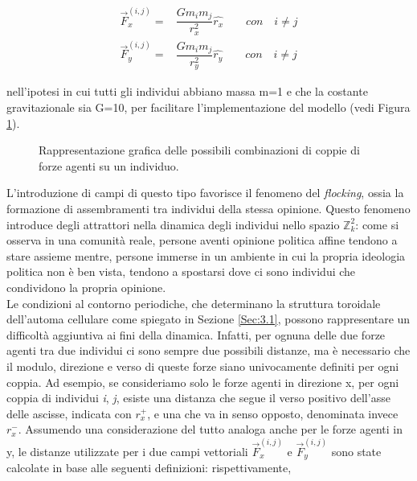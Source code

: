 \documentclass[letterpaper,10pt]{article}
\newcommand{\Zii}{$\mathbb{Z}^2_k$}
\begin{document}
\begin{equation}
\begin{aligned}
    \vec{F}_x^{(i,j)} =& \dfrac{Gm_im_j}{r_x^2} \hat{r_x} \quad\quad con \quad i\neq j\\
    \vec{F}_y^{(i,j)} =& \dfrac{Gm_im_j}{r_y^2} \hat{r_y} \quad\quad con \quad i\neq j
\end{aligned}
\label{Eq:5}
\end{equation}

nell'ipotesi in cui tutti gli individui abbiano massa m=1 e che la costante gravitazionale sia G=10, per facilitare l'implementazione del modello (vedi Figura \ref{Fig:7}). 

\begin{figure}[h]
\centering
{}
\caption{Rappresentazione grafica delle possibili combinazioni di coppie di forze agenti su un individuo.}
\label{Fig:7}
\end{figure}

L'introduzione di campi di questo tipo favorisce il fenomeno del \textit{flocking}, ossia la formazione di assembramenti tra individui della stessa opinione. Questo fenomeno introduce degli attrattori nella dinamica degli individui nello spazio \Zii: come si osserva in una comunità reale, persone aventi opinione politica affine tendono a stare assieme mentre, persone immerse in un ambiente in cui la propria ideologia politica non è ben vista, tendono a spostarsi dove ci sono individui che condividono la propria opinione.
\\
Le condizioni al contorno periodiche, che determinano la struttura toroidale dell'automa cellulare come spiegato in Sezione \ref{Sec:3.1}, possono rappresentare un difficoltà aggiuntiva ai fini della dinamica. Infatti, per ognuna delle due forze agenti tra due individui ci sono sempre due possibili distanze, ma è necessario che il modulo, direzione e verso di queste forze siano univocamente definiti per ogni coppia. Ad esempio, se consideriamo solo le forze agenti in direzione x, per ogni coppia di individui \textit{i}, \textit{j}, esiste una distanza che segue il verso positivo dell'asse delle ascisse, indicata con $r_x^+$, e una che va in senso opposto, denominata invece $r_x^-$. Assumendo una considerazione del tutto analoga anche per le forze agenti in y, le distanze utilizzate per i due campi vettoriali $\vec{F}^{(i,j)}_x$ e $\vec{F}^{(i,j)}_y$ sono state calcolate in base alle seguenti definizioni: rispettivamente,
\end{document}
